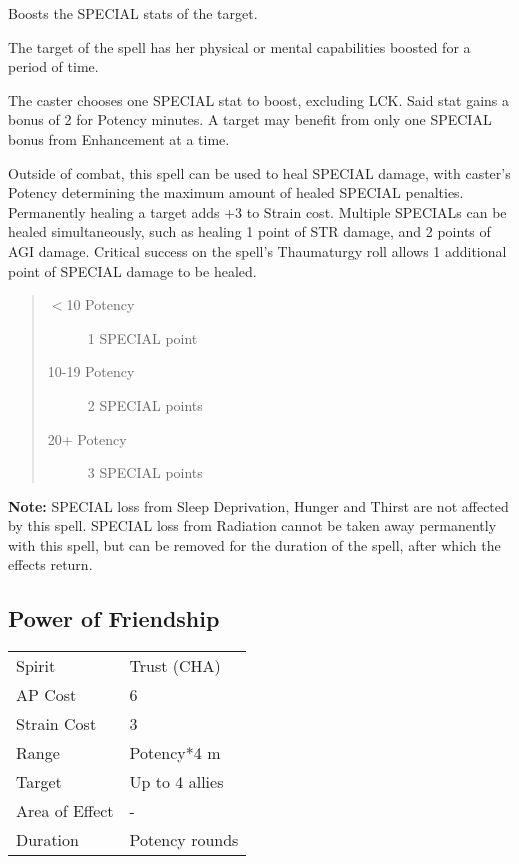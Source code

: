\documentclass[11pt,a4paper,twocolumn]{book}
\begin{document}
\medskip

Boosts the SPECIAL stats of the target.

The target of the spell has her physical or mental capabilities boosted for a period of time.

The caster chooses one SPECIAL stat to boost, excluding LCK. Said stat gains a bonus of 2 for Potency minutes. A target may benefit from only one SPECIAL bonus from Enhancement at a time.

Outside of combat, this spell can be used to heal SPECIAL damage, with caster's Potency determining the maximum amount of healed SPECIAL penalties. Permanently healing a target adds +3 to Strain cost. Multiple SPECIALs can be healed simultaneously, such as healing 1 point of STR damage, and 2 points of AGI damage. Critical success on the spell's Thaumaturgy roll allows 1 additional point of SPECIAL damage to be healed.

\begin{quote}
	\begin{description}
		\item[$<$10 Potency] 	1 SPECIAL point
		\item[10-19 Potency] 	2 SPECIAL points
		\item[20+ Potency] 		3 SPECIAL points
	\end{description}	
\end{quote}

\textbf{Note:} SPECIAL loss from Sleep Deprivation, Hunger and Thirst are not affected by this spell. SPECIAL loss from Radiation cannot be taken away permanently with this spell, but can be removed for the duration of the spell, after which the effects return.

\subsection*{Power of Friendship}
{
	\begin{tabu} to 75mm{| X[l,4] | X[l,7] |}
		\hline
		Spirit         & Trust (CHA)    \\
		AP Cost        & 6              \\
		Strain Cost    & 3              \\
		Range          & Potency*4 m    \\
		Target         & Up to 4 allies \\
		Area of Effect & -              \\
		Duration       & Potency rounds \\ \hline
	\end{tabu}
	
}
\end{document}

